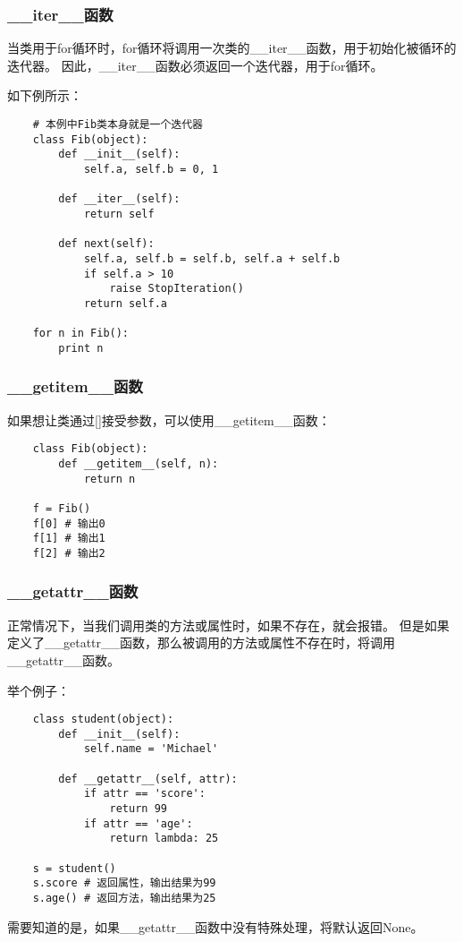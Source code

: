 \documentclass[a4paper,left=2.5cm,right=2.5cm,11pt]{article}
\begin{document}
\subsubsection{\_\_iter\_\_函数}
	当类用于for循环时，for循环将调用一次类的\_\_iter\_\_函数，用于初始化被循环的迭代器。
	因此，\_\_iter\_\_函数必须返回一个迭代器，用于for循环。\par

	如下例所示：
	\begin{lstlisting}
	# 本例中Fib类本身就是一个迭代器
	class Fib(object):
		def __init__(self):
			self.a, self.b = 0, 1

		def __iter__(self):
			return self 
			
		def next(self):
			self.a, self.b = self.b, self.a + self.b
			if self.a > 10
				raise StopIteration()
			return self.a

	for n in Fib():
		print n
	\end{lstlisting}

\subsubsection{\_\_getitem\_\_函数}
	如果想让类通过[]接受参数，可以使用\_\_getitem\_\_函数：
	\begin{lstlisting}
	class Fib(object):
		def __getitem__(self, n):
			return n

	f = Fib()
	f[0] # 输出0
	f[1] # 输出1
	f[2] # 输出2
	\end{lstlisting}

\subsubsection{\_\_getattr\_\_函数}
	正常情况下，当我们调用类的方法或属性时，如果不存在，就会报错。
	但是如果定义了\_\_getattr\_\_函数，那么被调用的方法或属性不存在时，将调用\_\_getattr\_\_函数。\par

	举个例子：
	\begin{lstlisting}
	class student(object):
		def __init__(self):
			self.name = 'Michael'

		def __getattr__(self, attr):
			if attr == 'score':
				return 99
			if attr == 'age':
				return lambda: 25
	
	s = student()
	s.score # 返回属性，输出结果为99
	s.age() # 返回方法，输出结果为25
	\end{lstlisting}

	需要知道的是，如果__getattr__函数中没有特殊处理，将默认返回None。
\end{document}
